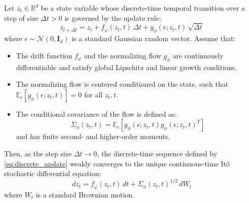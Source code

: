 \begin{theorem}
    Let $z_t \in \mathbb{R}^d$ be a state variable whose discrete-time temporal transition over a step of size $\Delta t > 0$ is governed by the update rule:
    \begin{equation}\label{eq:discrete_update}
        z_{t+\Delta t} = z_t + f_\varphi(z_t, t)\,\Delta t + g_\phi(\epsilon; z_t, t)\,\sqrt{\Delta t}
    \end{equation}
    where $\epsilon \sim \mathcal{N}(0, \boldsymbol{I}_d)$ is a standard Gaussian random vector. Assume that:
    \begin{itemize}
        \item The drift function $f_\varphi$ and the normalizing flow $g_\phi$ are continuously differentiable and satisfy global Lipschitz and linear growth conditions.
        \item The normalizing flow is centered conditioned on the state, such that $\mathbb{E}_{\epsilon}[g_\phi(\epsilon; z_t, t)] = 0$ for all $z_t, t$.
        \item The conditional covariance of the flow is defined as:
        \begin{equation}
            \Sigma_\phi(z_t, t) = \mathbb{E}_{\epsilon}\left[ g_\phi(\epsilon; z_t, t) g_\phi(\epsilon; z_t, t)^T \right]
        \end{equation}
        and has finite second- and higher-order moments.
    \end{itemize}

Then, as the step size $\Delta t \to 0$, the discrete-time sequence defined by \eqref{eq:discrete_update} weakly converges to the unique continuous-time It\^{o} stochastic differential equation:
\begin{equation}
    \label{eq:continuous_sde}
    dz_t = f_\varphi(z_t, t)\,dt + \Sigma_\phi(z_t, t)^{1/2}\,dW_t
\end{equation}
where $W_t$ is a standard Brownian motion.
\end{theorem}

